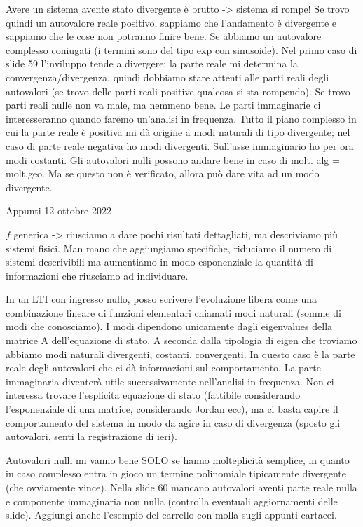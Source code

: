 \documentclass[a4paper]{report}
\begin{document}
Avere un sistema avente stato divergente è brutto -> sistema si rompe! Se trovo quindi un autovalore reale positivo, sappiamo che l'andamento è divergente e sappiamo che le cose non potranno finire bene.
\bb
Se abbiamo un autovalore complesso coniugati (i termini sono del tipo exp con sinusoide). Nel primo caso di slide 59 l'inviluppo tende a divergere: la parte reale mi determina la convergenza/divergenza, quindi dobbiamo stare attenti alle parti reali degli autovalori (se trovo delle parti reali positive qualcosa si sta rompendo). Se trovo parti reali nulle non va male, ma nemmeno bene.
\bb
Le parti immaginarie ci interesseranno quando faremo un'analisi in frequenza. Tutto il piano complesso in cui la parte reale è positiva mi dà origine a modi naturali di tipo divergente; nel caso di parte reale negativa ho modi divergenti. Sull'asse immaginario ho per ora modi costanti.
\bb
Gli autovalori nulli possono andare bene in caso di molt. alg = molt.geo. Ma se questo non è verificato, allora può dare vita ad un modo divergente.


\starbreak
\begin{center}
Appunti 12 ottobre 2022
\end{center}

$f$ generica -> riusciamo a dare pochi risultati dettagliati, ma descriviamo più sistemi fisici. Man mano che aggiungiamo specifiche, riduciamo il numero di sistemi descrivibili ma aumentiamo in modo esponenziale la quantità di informazioni che riusciamo ad individuare.
\begin{defin}{}{}
In un LTI con ingresso nullo, posso scrivere l'evoluzione libera come una combinazione lineare di funzioni elementari chiamati modi naturali (somme di modi che conosciamo).
\bb
I modi dipendono unicamente dagli eigenvalues della matrice A dell'equazione di stato. A seconda dalla tipologia di eigen che troviamo abbiamo modi naturali divergenti, costanti, convergenti. In questo caso è la parte reale degli autovalori che ci dà informazioni sul comportamento.
\bb
La parte immaginaria diventerà utile successivamente nell'analisi in frequenza.
\bb
Non ci interessa trovare l'esplicita equazione di stato (fattibile considerando l'esponenziale di una matrice, considerando Jordan ecc), ma ci basta capire il comportamento del sistema in modo da agire in caso di divergenza (sposto gli autovalori, senti la registrazione di ieri).	
\end{defin}
Autovalori nulli mi vanno bene SOLO se hanno molteplicità semplice, in quanto in caso complesso entra in gioco un termine polinomiale tipicamente divergente (che ovviamente vince).
\bb
Nella slide 60 mancano autovalori aventi parte reale nulla e componente immaginaria non nulla (controlla eventuali aggiornamenti delle slide). Aggiungi anche l'esempio del carrello con molla sugli appunti cartacei.
\end{document}
